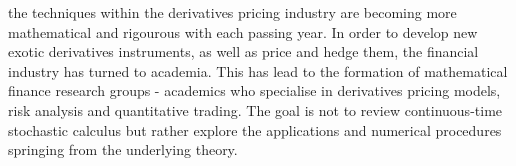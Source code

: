 the techniques within the derivatives pricing industry are becoming more mathematical and rigourous with each passing year. In order to develop new exotic derivatives instruments, as well as price and hedge them, the financial industry has turned to academia. This has lead to the formation of mathematical finance research groups - academics who specialise in derivatives pricing models, risk analysis and quantitative trading.
The goal is not to review continuous-time stochastic calculus but rather explore the applications and numerical procedures springing from the underlying theory.